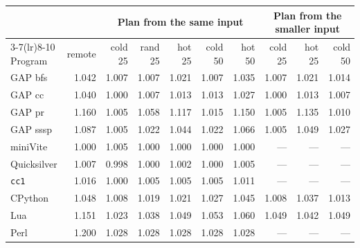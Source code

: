 \begin{tabular}{lrrrrrrrrr}
\toprule
 & & \multicolumn{5}{c}{Plan from the same input} & \multicolumn{3}{c}{Plan from the smaller input} \\
\cmidrule(lr){3-7}\cmidrule(lr){8-10}
Program & remote & cold 25 & rand 25 & hot 25 & cold 50 & hot 50 & cold 25 & hot 25 & cold 50 \\
\midrule
GAP bfs & 1.042 & 1.007 & 1.007 & 1.021 & 1.007 & 1.035 & 1.007 & 1.021 & 1.014 \\
GAP cc & 1.040 & 1.000 & 1.007 & 1.013 & 1.013 & 1.027 & 1.000 & 1.013 & 1.007 \\
GAP pr & 1.160 & 1.005 & 1.058 & 1.117 & 1.015 & 1.150 & 1.005 & 1.135 & 1.010 \\
GAP sssp & 1.087 & 1.005 & 1.022 & 1.044 & 1.022 & 1.066 & 1.005 & 1.049 & 1.027 \\
miniVite & 1.000 & 1.005 & 1.000 & 1.000 & 1.000 & 1.000 & --- & --- & --- \\
Quicksilver & 1.007 & 0.998 & 1.000 & 1.002 & 1.000 & 1.005 & --- & --- & --- \\
\texttt{cc1} & 1.016 & 1.000 & 1.005 & 1.005 & 1.005 & 1.011 & --- & --- & --- \\
CPython & 1.048 & 1.008 & 1.019 & 1.021 & 1.027 & 1.045 & 1.008 & 1.037 & 1.013 \\
Lua & 1.151 & 1.023 & 1.038 & 1.049 & 1.053 & 1.060 & 1.049 & 1.042 & 1.049 \\
Perl & 1.200 & 1.028 & 1.028 & 1.028 & 1.028 & 1.028 & --- & --- & --- \\
\bottomrule
\end{tabular}
